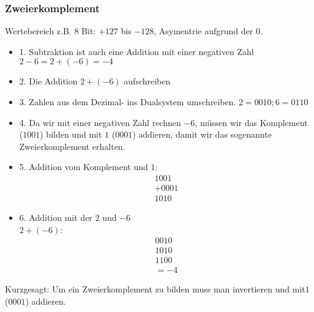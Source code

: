 \subsubsection{Zweierkomplement}
Wertebereich z.B. 8 Bit: $+127$ bis $-128$, Asymentrie aufgrund der $0$.
\begin{itemize}
    \item 1. Subtraktion ist auch eine Addition mit einer negativen Zahl $2 - 6 = 2 + (-6) = -4$
    \item 2. Die Addition $2 + (-6)$ aufschreiben
    \item 3. Zahlen aus dem Dezimal- ins Dualsystem umschreiben. $2 = 0010 ; 6 = 0110$
    \item 4. Da wir mit einer negativen Zahl rechnen $-6$, müssen wir das Komplement ($1001$) bilden und mit $1$ ($0001$) addieren, damit wir das sogenannte Zweierkomplement erhalten.
    \item 5. Addition vom Komplement und $1$: 
    \begin{align*}
        1001\\
        +0001\\
        \hline
        1010
    \end{align*}
    \item 6. Addition mit der $2$ und $-6$ \\
    $2 + (-6)$:
    \begin{align*}
        0010\\
        1010\\
        \hline
        1100\\
        = -4
    \end{align*}
\end{itemize}
\bigskip
Kurzgesagt: Um ein Zweierkomplement zu bilden muss man invertieren und mit$ 1$ ($0001$) addieren.
